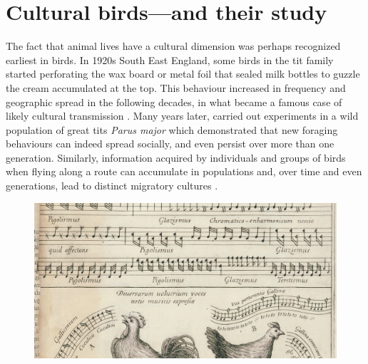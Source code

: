 \section{Cultural birds---and their study}
The fact that animal lives have a cultural dimension was perhaps recognized earliest in birds. In 1920s South East England, some birds in the tit family started perforating the wax board or metal foil that sealed milk bottles to guzzle the cream accumulated at the top. This behaviour increased in frequency and geographic spread in the following decades, in what became a famous case of likely cultural transmission \autocite{fisher1949}. Many years later, \textcite{aplin2015} carried out experiments in a wild population of great tits \textit{Parus major} which demonstrated that new foraging behaviours can indeed spread socially, and even persist over more than one generation. Similarly, information acquired by individuals and groups of birds when flying along a route can accumulate in populations and, over time and even generations, lead to distinct migratory cultures \autocite{berdahl2018,byholm2022,jesmer2018,sasaki2017}.

\begin{figure}[th!]
    \centering
    \includegraphics[width=\linewidth]{figures/chapter_1/musurgia.jpg}
    \label{c1_fig:musurgia}
\end{figure}

